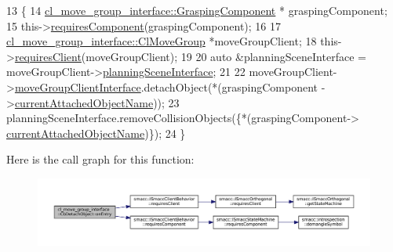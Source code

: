 \begin{DoxyCode}
13     \{
14         \hyperlink{classcl__move__group__interface_1_1GraspingComponent}{cl\_move\_group\_interface::GraspingComponent} *
      graspingComponent;
15         this->\hyperlink{classsmacc_1_1ISmaccClientBehavior_a19c6d658c8e809bb93bfdc9b639a3ac3}{requiresComponent}(graspingComponent);
16 
17         \hyperlink{classcl__move__group__interface_1_1ClMoveGroup}{cl\_move\_group\_interface::ClMoveGroup} *moveGroupClient;
18         this->\hyperlink{classsmacc_1_1ISmaccClientBehavior_a32b16e99e3b4cb289414203dc861a440}{requiresClient}(moveGroupClient);
19 
20         \textcolor{keyword}{auto} &planningSceneInterface = moveGroupClient->\hyperlink{classcl__move__group__interface_1_1ClMoveGroup_a11bfab580f36e2ad32c9b37d6f58f44c}{planningSceneInterface};
21 
22         moveGroupClient->\hyperlink{classcl__move__group__interface_1_1ClMoveGroup_a92922ea689e4e1b7b91512c56629c95b}{moveGroupClientInterface}.detachObject(*(graspingComponent
      ->\hyperlink{classcl__move__group__interface_1_1GraspingComponent_a486b5c831dc81ae0bf909b585ba7c615}{currentAttachedObjectName}));
23         planningSceneInterface.removeCollisionObjects(\{*(graspingComponent->
      \hyperlink{classcl__move__group__interface_1_1GraspingComponent_a486b5c831dc81ae0bf909b585ba7c615}{currentAttachedObjectName})\});
24     \}
\end{DoxyCode}
Here is the call graph for this function\+:
\nopagebreak
\begin{figure}[H]
\begin{center}
\leavevmode
\includegraphics[width=350pt]{classcl__move__group__interface_1_1CbDetachObject_a04af88f1d9b64c43eb2620ac5bd62c35_cgraph}
\end{center}
\end{figure}
\mbox{\label{classcl__move__group__interface_1_1CbDetachObject_ae5c6ada3c6631c9fa0bfb2d461ce4678}} 
